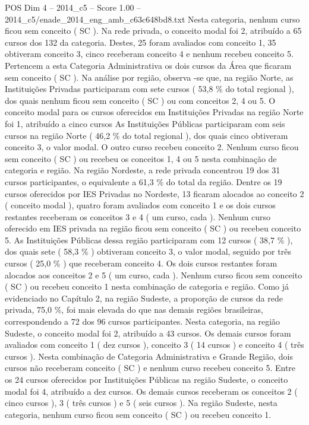 \begin{textsample}{POS Dim 4 – 2014\_c5 – Score 1.00 – 2014\_c5/enade\_2014\_eng\_amb\_c63c648bd8.txt}
Nesta categoria, nenhum curso ficou sem conceito ( SC ).
Na rede privada, o conceito modal foi 2, atribuído a 65 cursos dos 132 da categoria.
Destes, 25 foram avaliados com conceito 1, 35 obtiveram conceito 3, cinco receberam conceito 4 e nenhum recebeu conceito 5.
Pertencem a esta Categoria Administrativa os dois cursos da Área que ficaram sem conceito ( SC ).
Na análise por região, observa -se que, na região Norte, as Instituições Privadas participaram com sete cursos ( 53,8 \% do total regional ), dos quais nenhum ficou sem conceito ( SC ) ou com conceitos 2, 4 ou 5.
O conceito modal para os cursos oferecidos em Instituições Privadas na região Norte foi 1, atribuído a cinco cursos As Instituições Públicas participaram com seis cursos na região Norte ( 46,2 \% do total regional ), dos quais cinco obtiveram conceito 3, o valor modal.
O outro curso recebeu conceito 2.
Nenhum curso ficou sem conceito ( SC ) ou recebeu os conceitos 1, 4 ou 5 nesta combinação de categoria e região.
Na região Nordeste, a rede privada concentrou 19 dos 31 cursos participantes, o equivalente a 61,3 \% do total da região.
Dentre os 19 cursos oferecidos por IES Privadas no Nordeste, 13 ficaram alocados ao conceito 2 ( conceito modal ), quatro foram avaliados com conceito 1 e os dois cursos restantes receberam os conceitos 3 e 4 ( um curso, cada ).
Nenhum curso oferecido em IES privada na região ficou sem conceito ( SC ) ou recebeu conceito 5.
As Instituições Públicas dessa região participaram com 12 cursos ( 38,7 \% ), dos quais sete ( 58,3 \% ) obtiveram conceito 3, o valor modal, seguido por três cursos ( 25,0 \% ) que receberam conceito 4.
Os dois cursos restantes foram alocados aos conceitos 2 e 5 ( um curso, cada ).
Nenhum curso ficou sem conceito ( SC ) ou recebeu conceito 1 nesta combinação de categoria e região.
Como já evidenciado no Capítulo 2, na região Sudeste, a proporção de cursos da rede privada, 75,0 \%, foi mais elevada do que nas demais regiões brasileiras, correspondendo a 72 dos 96 cursos participantes.
Nesta categoria, na região Sudeste, o conceito modal foi 2, atribuído a 43 cursos.
Os demais cursos foram avaliados com conceito 1 ( dez cursos ), conceito 3 ( 14 cursos ) e conceito 4 ( três cursos ).
Nesta combinação de Categoria Administrativa e Grande Região, dois cursos não receberam conceito ( SC ) e nenhum curso recebeu conceito 5.
Entre os 24 cursos oferecidos por Instituições Públicas na região Sudeste, o conceito modal foi 4, atribuído a dez cursos.
Os demais cursos receberam os conceitos 2 ( cinco cursos ), 3 ( três cursos ) e 5 ( seis cursos ).
Na região Sudeste, nesta categoria, nenhum curso ficou sem conceito ( SC ) ou recebeu conceito 1.

\end{textsample}
